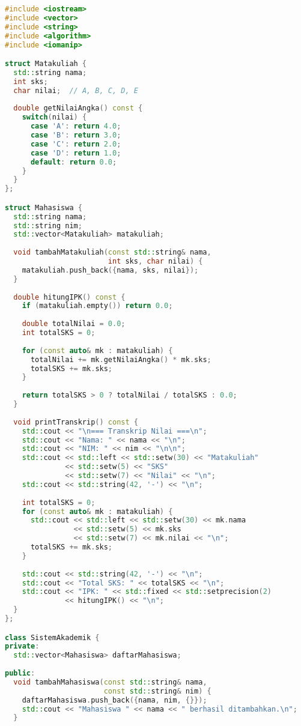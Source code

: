 \documentclass[../main.tex]{subfiles}
\begin{document}
\begin{lstlisting}[language=C++, caption={Sistem manajemen mahasiswa di C++}]
#include <iostream>
#include <vector>
#include <string>
#include <algorithm>
#include <iomanip>

struct Matakuliah {
  std::string nama;
  int sks;
  char nilai;  // A, B, C, D, E
  
  double getNilaiAngka() const {
    switch(nilai) {
      case 'A': return 4.0;
      case 'B': return 3.0;
      case 'C': return 2.0;
      case 'D': return 1.0;
      default: return 0.0;
    }
  }
};

struct Mahasiswa {
  std::string nama;
  std::string nim;
  std::vector<Matakuliah> matakuliah;
  
  void tambahMatakuliah(const std::string& nama, 
                        int sks, char nilai) {
    matakuliah.push_back({nama, sks, nilai});
  }
  
  double hitungIPK() const {
    if (matakuliah.empty()) return 0.0;
    
    double totalNilai = 0.0;
    int totalSKS = 0;
    
    for (const auto& mk : matakuliah) {
      totalNilai += mk.getNilaiAngka() * mk.sks;
      totalSKS += mk.sks;
    }
    
    return totalSKS > 0 ? totalNilai / totalSKS : 0.0;
  }
  
  void printTranskrip() const {
    std::cout << "\n=== Transkrip Nilai ===\n";
    std::cout << "Nama: " << nama << "\n";
    std::cout << "NIM: " << nim << "\n\n";
    std::cout << std::left << std::setw(30) << "Matakuliah"
              << std::setw(5) << "SKS"
              << std::setw(7) << "Nilai" << "\n";
    std::cout << std::string(42, '-') << "\n";
    
    int totalSKS = 0;
    for (const auto& mk : matakuliah) {
      std::cout << std::left << std::setw(30) << mk.nama
                << std::setw(5) << mk.sks
                << std::setw(7) << mk.nilai << "\n";
      totalSKS += mk.sks;
    }
    
    std::cout << std::string(42, '-') << "\n";
    std::cout << "Total SKS: " << totalSKS << "\n";
    std::cout << "IPK: " << std::fixed << std::setprecision(2)
              << hitungIPK() << "\n";
  }
};

class SistemAkademik {
private:
  std::vector<Mahasiswa> daftarMahasiswa;
  
public:
  void tambahMahasiswa(const std::string& nama, 
                       const std::string& nim) {
    daftarMahasiswa.push_back({nama, nim, {}});
    std::cout << "Mahasiswa " << nama << " berhasil ditambahkan.\n";
  }
  

\end{lstlisting}
\end{document}
